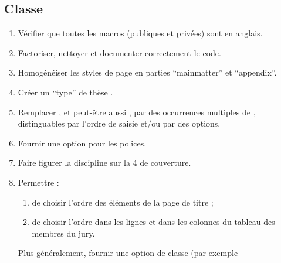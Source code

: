 \subsection{Classe}
\label{sec:classe-ult}

\begin{enumerate}
\item Vérifier que toutes les macros (publiques et privées) sont en anglais.
\item Factoriser, nettoyer et documenter correctement le code.
\item Homogénéiser les styles de page en parties \enquote{mainmatter} et
  \enquote{appendix}.
\item Créer un \enquote{type} de thèse .
\item Remplacer , et peut-être aussi , par des
  occurrences multiples de , distinguables par l'ordre de saisie
  et/ou par des  options.
\item Fournir une option pour les polices.
\item Faire figurer la discipline sur la 4\ieme{} de couverture.
\item Permettre :
  \begin{enumerate}
  \item de choisir l'ordre des éléments de la page de titre ;
  \item de choisir l'ordre dans les lignes et dans les colonnes du
    tableau des membres du jury.
  \end{enumerate}
  Plus généralement, fournir une option de classe (par exemple

\end{enumerate}
